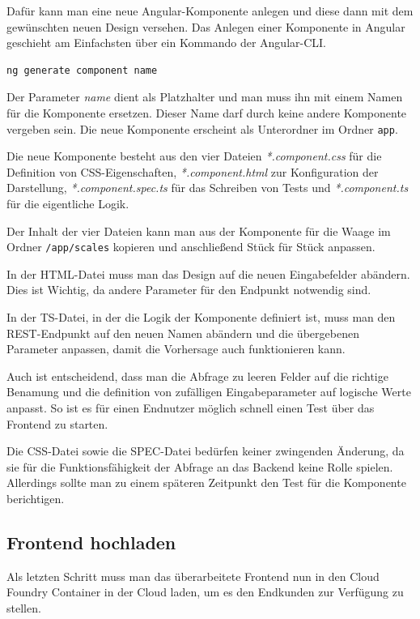 Dafür kann man eine neue Angular-Komponente anlegen und diese dann mit dem gewünschten neuen Design versehen. Das
Anlegen einer Komponente in Angular geschieht am Einfachsten über ein Kommando der Angular-CLI.

\begin{lstlisting}[caption=Erstellen einer neuen Komponente, label=ls:schlauchbeutelmaschine_component]
    ng generate component name
\end{lstlisting}

Der Parameter \textit{name} dient als Platzhalter und man muss ihn mit einem Namen für die Komponente ersetzen. Dieser
Name darf durch keine andere Komponente vergeben sein. Die neue Komponente erscheint als Unterordner im Ordner
\texttt{app}.

Die neue Komponente besteht aus den vier Dateien \textit{*.component.css} für die Definition von CSS-Eigenschaften,
\textit{*.component.html} zur Konfiguration der Darstellung, \textit{*.component.spec.ts} für das Schreiben von Tests
und \textit{*.component.ts} für die eigentliche Logik.

Der Inhalt der vier Dateien kann man aus der Komponente für die Waage im Ordner \texttt{/app/scales} kopieren und
anschließend Stück für Stück anpassen.

In der HTML-Datei muss man das Design auf die neuen Eingabefelder abändern. Dies ist Wichtig, da andere Parameter für
den Endpunkt notwendig sind.

In der TS-Datei, in der die Logik der Komponente definiert ist, muss man den REST-Endpunkt auf den neuen Namen abändern
und die übergebenen Parameter anpassen, damit die Vorhersage auch funktionieren kann.

Auch ist entscheidend, dass man die Abfrage zu leeren Felder auf die richtige Benamung und die definition von
zufälligen Eingabeparameter auf logische Werte anpasst. So ist es für einen Endnutzer möglich schnell einen Test über
das Frontend zu starten.

Die CSS-Datei sowie die SPEC-Datei bedürfen keiner zwingenden Änderung, da sie für die Funktionsfähigkeit der Abfrage an
das Backend keine Rolle spielen. Allerdings sollte man zu einem späteren Zeitpunkt den Test für die Komponente
berichtigen.

\subsection{Frontend hochladen}
Als letzten Schritt muss man das überarbeitete Frontend nun in den Cloud Foundry Container in der Cloud laden, um es den
Endkunden zur Verfügung zu stellen.


